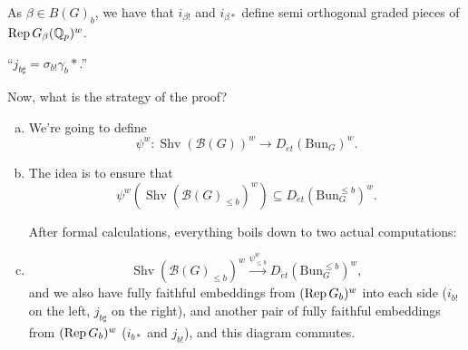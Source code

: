 \documentclass[reqno]{amsart} 
\begin{document}
As $\beta \in B(G)_{b}$, we have that $i_{\beta !}$ and $i_{\beta \ast}$ define semi orthogonal graded pieces of $\operatorname{Rep} G_{\beta}(\mathbb{Q}_p)^w$.

``$j_{b \sharp} = \sigma_{b!} \gamma_b \ast$.''

Now, what is the strategy of the proof?
\begin{enumerate}[(a)]
\item\label{enumerate:cnppk3hce9} We're going to define
  \begin{equation*}
    \psi^w : \operatorname{Shv}(\mathcal{B}(G))^w \rightarrow D_{\acute{e}t}(\mathrm{Bun}_G)^w.
  \end{equation*}
\item\label{enumerate:cnppk3hc7k} The idea is to ensure that
  \begin{equation*}
    \psi^w \left( \operatorname{Shv}(\mathcal{B}(G)_{\leq b})^w \right)
    \subseteq D_{\acute{e}t}(\mathrm{Bun}_G^{\leq b})^w.
  \end{equation*}

  After formal calculations, everything boils down to two actual computations:
\item\label{enumerate:cnppk3heo2}
  \begin{equation*}
    \operatorname{Shv}(\mathcal{B}(G)_{\leq b})^w
    \xrightarrow{\psi_{\leq b}^w} D_{\acute{e}t}(\mathrm{Bun}_G^{\leq b})^w,    
  \end{equation*}
  and we also have fully faithful embeddings from $(\operatorname{Rep} G_b)^w$ into each side ($i_{b!}$ on the left, $j_{b \sharp}$ on the right), and another pair of fully faithful embeddings from $(\operatorname{Rep} G_b)^w$ ($i_{b \ast}$ and $j_{b !}$), and this diagram commutes.
\end{enumerate}
\end{document}
